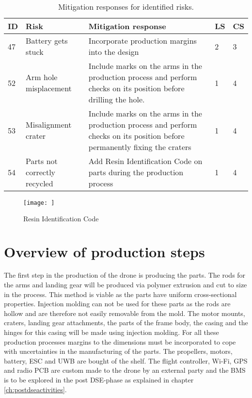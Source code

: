 \begin{table}[h]
\centering
\caption{Mitigation responses for identified risks.}
\label{tab:pprisksresponses}
\begin{scriptsize}
\begin{tabular}{|p{0.4cm}|p{3cm}|p{9.2cm}|p{0.4cm}|p{0.4cm}|} 
\hline
\multicolumn{1}{|l|}{\textbf{ID}} & \textbf{Risk}                                               & \textbf{Mitigation response}                                                                                                                                                               & \multicolumn{1}{l|}{\textbf{LS}} & \multicolumn{1}{l|}{\textbf{CS}} \\ \hline

47 & Battery gets stuck & Incorporate production margins into the design & 2&3\\\hline
52 & Arm hole misplacement & Include marks on the arms in the production process  and perform checks on its position before drilling the hole. & 1 & 4 \\ \hline
53 & Misalignment crater & Include marks on the arms in the production process and perform checks on its position before permanently fixing the craters & 1 & 4 \\ \hline
54 & Parts not correctly recycled & Add Resin Identification Code on parts during the production process& 1 & 4\\ \hline

\end{tabular}
\end{scriptsize}
\end{table}

\begin{figure}[H]
    \centering
    \texttt{[image: ]}
    \caption{Resin Identification Code}
    \label{fig:RIC label}
\end{figure}

\section{Overview of production steps} \label{sec:overviewpp}
The first step in the production of the drone is producing the parts. The rods for the arms and landing gear will be produced via polymer extrusion and cut to size in the process. This method is viable as the parts have uniform cross-sectional properties. Injection molding can not be used for these parts as the rods are hollow and are therefore not easily removable from the mold. The motor mounts, craters, landing gear attachments, the parts of the frame body, the casing and the hinges for this casing will be made using injection molding. For all these production processes margins to the dimensions must be incorporated to cope with uncertainties in the manufacturing of the parts. The propellers, motors, battery, ESC and UWB are bought of the shelf. The flight controller, Wi-Fi, GPS and radio PCB are custom made to the drone by an external party and the BMS is to be explored in the post DSE-phase as explained in chapter \autoref{ch:postdseactivities}.

